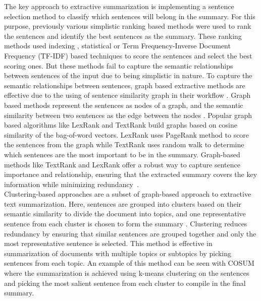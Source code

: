 \documentclass[acmlarge]{acmart}
\begin{document}
The key approach to extractive summarization is implementing a sentence selection method to classify which sentences will belong in the summary. For this purpose, previously various simplistic ranking based methods were used to rank the sentences and identify the best sentences as the summary. These ranking methods used indexing \cite{Baxendale_1958_firstsummarization}, statistical \cite{edmundson_1969_earlysum} or Term Frequency-Inverse Document Frequency (TF-IDF) \cite{das-2022-tfidf,sarkar-2012-tfidf-2,sarkar-2012-tfidf} based techniques to score the sentences and  select the best scoring ones. But these methods fail to capture the semantic relationships between sentences of the input due to being simplistic in nature. To capture the semantic relationships between sentences, graph based extractive methods are effective due to the using of sentence similarity graph in their workflow \cite{wafaa-2021-summary-comprehensive-review}. Graph based methods represent the sentences as nodes of a graph, and the semantic similarity between two sentences as the edge between the nodes \cite{moratanch-2017-extractive-review}. Popular graph based algorithms like LexRank \cite{Erkan-lexRank-2004} and TextRank \cite{mihalcea-2004-textrank} build graphs based on cosine similarity of the bag-of-word vectors. LexRank uses PageRank \cite{page-PageRank-1999} method to score the sentences from the graph while TextRank uses random walk to determine which sentences are the most important to be in the summary. Graph-based methods like TextRank and LexRank offer a robust way to capture sentence importance and relationship, ensuring that the extracted summary covers the key information while minimizing redundancy~\cite{wafaa-2021-summary-comprehensive-review}.\\  

Clustering-based approaches are a subset of graph-based approach to extractive text summarization. Here, sentences are grouped into clusters based on their semantic similarity to divide the document into topics, and one representative sentence from each cluster is chosen to form the summary \cite{Mohan-2022-topic-modeling-rev-clustering}. Clustering reduces redundancy by ensuring that similar sentences are grouped together and only the most representative sentence is selected. This method is effective in summarization of documents with multiple topics or subtopics by picking sentences from each topic. An example of this method can be seen with COSUM \cite{alguliyev-2019-cosum} where the summarization is achieved using k-means clustering on the sentences and picking the most salient sentence from each cluster to compile in the final summary.\\
\end{document}
